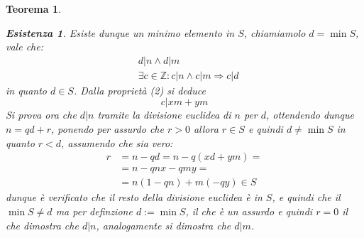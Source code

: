 \documentclass{article}
\makeatletter
\renewenvironment{proof}[1][\proofname]{\par
    \pushQED{\qed}%
    \normalfont \topsep6\p@\@plus6\p@\relax
    \trivlist
    \item\relax
    {\itshape
    #1\@addpunct{.}}\hspace\labelsep\ignorespaces
    }{%
    \popQED\endtrivlist\@endpefalse
}
\newtheorem{theorem}{Teorema}[part]
\theoremstyle{definition}
\newtheorem*{existence}{Esistenza}
\makeatother
\begin{document}
\begin{theorem}
\begin{proof}
\begin{existence}
            Esiste dunque un minimo elemento in \(S\), chiamiamolo \(d=\min S\), vale che: 
            \[
                \begin{aligned}
                    &d|n \wedge d|m\\
                    &\exists c\in\mathbb{Z}: c|n \wedge c|m \Rightarrow c|d
                \end{aligned}
            \]
            in quanto \(d\in S\).
            Dalla proprietà (2) si deduce \[c|xm+ym\]
            Si prova ora che \(d|n\) tramite la divisione euclidea di \(n\) per \(d\), ottendendo dunque \(n=qd+r\), ponendo per assurdo che \(r>0\) allora \(r\in S\) e quindi \(d\neq \min S\) in quanto \(r<d\), assumendo che sia vero:
            \[
                \begin{aligned}
                    r&=n-qd=n-q(xd+ym)=\\
                    &=n-qnx-qmy=\\
                    &=n(1-qn)+m(-qy)\in S
                \end{aligned}
            \]
            dunque è verificato che il resto della divisione euclidea è in \(S\), e quindi che il \(\min S\neq d\) ma per definzione \(d:=\min S\), il che è un assurdo e quindi \(r=0\) il che dimostra che \(d|n\), analogamente si dimostra che \(d|m\).
        \end{existence}
        \raggedleft{\pushQED{\ensuremath{\blacksquare}}}
    \end{proof}
\end{theorem}
\end{document}
